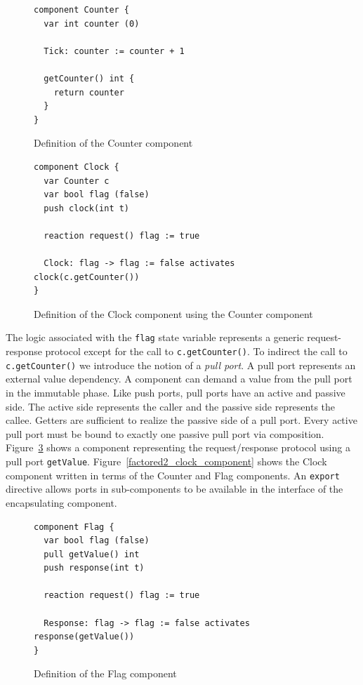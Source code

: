 \begin{figure}
\begin{verbatim}
component Counter {
  var int counter (0)

  Tick: counter := counter + 1

  getCounter() int {
    return counter
  }
}
\end{verbatim}
\caption{Definition of the Counter component\label{counter_component}}
\end{figure}

\begin{figure}
\begin{verbatim}
component Clock {
  var Counter c
  var bool flag (false)
  push clock(int t)

  reaction request() flag := true

  Clock: flag -> flag := false activates clock(c.getCounter())
}
\end{verbatim}
\caption{Definition of the Clock component using the Counter component\label{factored_clock_component}}
\end{figure}

The logic associated with the \verb+flag+ state variable represents a generic request-response protocol except for the call to \verb+c.getCounter()+.
To indirect the call to \verb+c.getCounter()+ we introduce the notion of a \emph{pull port}.
A pull port represents an external value dependency.
A component can demand a value from the pull port in the immutable phase.
Like push ports, pull ports have an active and passive side.
The active side represents the caller and the passive side represents the callee.
Getters are sufficient to realize the passive side of a pull port.
Every active pull port must be bound to exactly one passive pull port via composition.
Figure~\ref{flag_component} shows a component representing the request/response protocol using a pull port \verb+getValue+.
Figure~\ref{factored2_clock_component} shows the Clock component written in terms of the Counter and Flag components.
An \verb+export+ directive allows ports in sub-components to be available in the interface of the encapsulating component.

\begin{figure}
\begin{verbatim}
component Flag {
  var bool flag (false)
  pull getValue() int
  push response(int t)

  reaction request() flag := true

  Response: flag -> flag := false activates response(getValue())
}
\end{verbatim}
\caption{Definition of the Flag component\label{flag_component}}
\end{figure}

